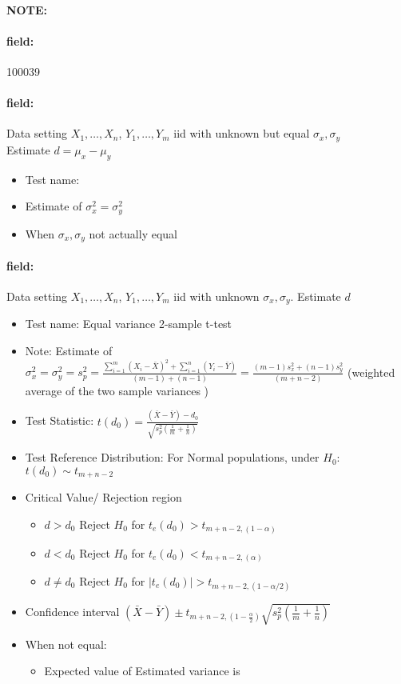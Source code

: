 \documentclass[12pt]{article}
\newenvironment{note}{\paragraph{NOTE:}}{}
\newenvironment{field}{\paragraph{field:}}{}
\begin{document}
\begin{note} \begin{field} \tiny 100039 \end{field}
 \begin{field}
  Data setting $X_1, \ldots , X_n$, $Y_1, \ldots, Y_m$ iid with unknown but equal  $\sigma_x, \sigma_y$ \\
  Estimate $d = \mu_x - \mu_y$
  \begin{itemize}
   \item Test name:
   \item Estimate of $\sigma_x^2 = \sigma_y^2$
   \item When $\sigma_x, \sigma_y$ not actually equal
  \end{itemize}
 \end{field}
 \begin{field}
  Data setting $X_1, \ldots , X_n$, $Y_1, \ldots, Y_m$ iid with unknown $\sigma_x, \sigma_y$. Estimate $d$
  \begin{itemize}
   \item Test name: Equal variance 2-sample t-test
   \item Note: Estimate of $\sigma_x^2 = \sigma_y^2 = s_p^2 = \frac{\sum_{i=1}^m (X_i - \bar{X})^2 + \sum_{i=1}^n (Y_i - \bar{Y})}{(m-1) + (n-1)} = \frac{(m-1)s_x^2 + (n-1)s_y^2}{(m+n-2)}$ (weighted average of the two sample variances )
   \item Test Statistic: $t(d_0) = \frac{(\bar{X} - \bar{Y}) - d_0}{\sqrt{s_p^2(\frac{1}{m} + \frac{1}{n})}}$
   \item Test Reference Distribution: For Normal populations, under $H_0$: $t(d_0) \sim t_{m+n-2}$
   \item Critical Value/ Rejection region
         \begin{itemize}
          \item $d > d_0$ Reject $H_0$ for $t_e(d_0) > t_{m+n-2,(1 - \alpha)}$
          \item $d < d_0$ Reject $H_0$ for $t_e(d_0) < t_{m+n-2,(\alpha)}$
          \item $d \neq d_0$ Reject $H_0$ for $|t_e(d_0)| > t_{m+n-2,(1 - \alpha/2)}$
         \end{itemize}
   \item Confidence interval $ (\bar{X} - \bar{Y}) \pm t_{m+n-2,(1 - \frac{\alpha}{2})}\sqrt{s_p^2(\frac{1}{m} + \frac{1}{n})}$
   \item When not equal:
         \begin{itemize}
          \item Expected value of Estimated variance is

\end{itemize}
\end{itemize}
\end{field}
\end{note}
\end{document}
